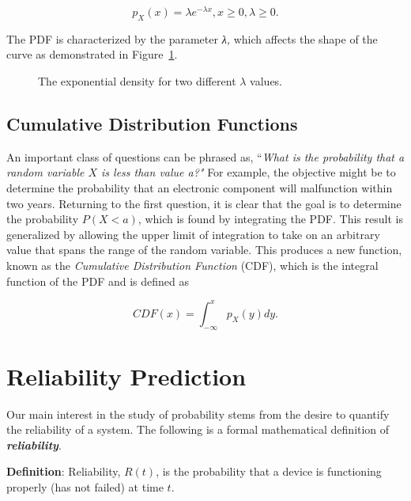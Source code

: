 \begin{equation}
\label{equ:exponentialDensity}
p_X(x) = \lambda e^{-\lambda x} , x \geq 0, \lambda \geq 0.
\end{equation}

The PDF is characterized by the parameter \emph{λ,} which affects the
shape of the curve as demonstrated in 
Figure~\ref{figure:exponentialDensityFunction}.


\begin{figure}
\caption{The exponential density for two different $\lambda$ values.}
\label{figure:exponentialDensityFunction}
\end{figure}


\subsection{Cumulative Distribution Functions}
\label{cumulative-distribution-functions}

An important class of questions can be phrased as, ``\emph{What is the
probability that a random variable $X$ is less than value a?"} For
example, the objective might be to determine the probability that an
electronic component will malfunction within two years. Returning to the
first question, it is clear that the goal is to determine the
probability $P(X<a)$, which is found by
integrating the PDF. This result is generalized by allowing the upper
limit of integration to take on an arbitrary value that spans the range
of the random variable. This produces a new function, known as the
\emph{Cumulative Distribution Function} (CDF), which is the integral
function of the PDF and is defined as

\begin{equation}
\label{equ:exponentialDensity}
CDF(x) = \int^x_{-\infty} p_X(y)dy.
\end{equation}

\section{Reliability Prediction}
\label{section:reliability-prediction}

Our main interest in the study of probability stems from the desire to
quantify the reliability of a system. The following is a formal
mathematical definition of \emph{\textbf{reliability}}.

\begin{itquote}
\textbf{Definition}: Reliability, $R(t)$, is the probability that a
device is functioning properly (has not failed) at time $t$.
\end{itquote}

